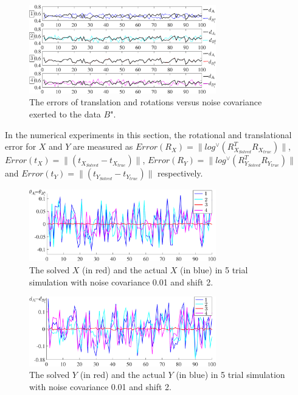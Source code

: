 \documentclass[letterpaper, 10 pt, conference]{ieeeconf}  %
\begin{document}
\begin{figure}
\centering
\includegraphics[width=3.2in]{fig3.eps}
\caption{
The errors of translation and rotations versus noise covariance exerted to the data $B$".
}
\label{fig3}
\end{figure}


In the numerical experiments in this section, the rotational and translational error for $X$ and $Y$ are measured as  $Error(R_X) = \parallel log^{\vee} (R_{X_{Solved}}^{T}R_{X_{true}})\parallel$, $Error(t_X) = \parallel (t_{X_{Solved}}-t_{X_{true}})\parallel$, $Error(R_Y) = \parallel log^{\vee} (R_{Y_{Solved}}^{T}R_{Y_{true}})\parallel$ and $Error(t_Y) = \parallel (t_{Y_{Solved}}-t_{Y_{true}})\parallel$ respectively.

\begin{center}
\begin{figure}
\centering
\includegraphics[width=3.2in]{fig4.eps}
\caption{
The solved $X$ (in red) and the actual $X$ (in blue) in 5 trial simulation with noise covariance 0.01 and shift 2.
}
\label{fig4}
\end{figure}
\end{center}

\begin{center}
\begin{figure}
\centering
\includegraphics[width=3.2in]{fig5.eps}
\caption{
The solved $Y$ (in red) and the actual $Y$ (in blue) in 5 trial simulation with noise covariance 0.01 and shift 2.
}
\label{fig5}
\end{figure}
\end{center}
\end{document}
